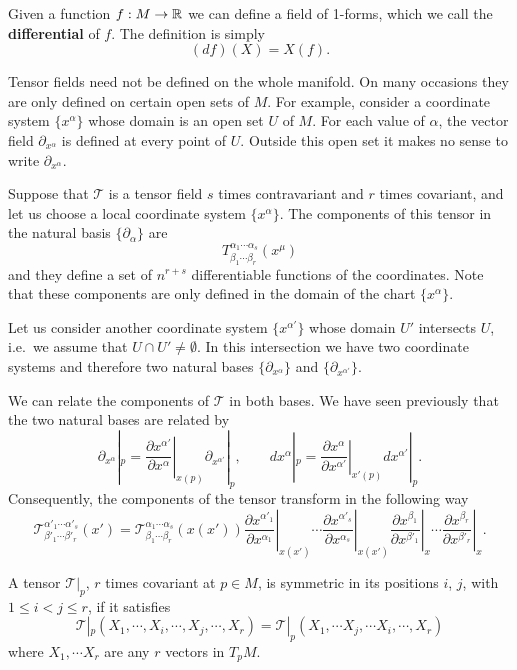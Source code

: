 \begin{points}
\item Given a function $f:M\to\mathbb{R}$ we can define a field of 1-forms, which we call the \textbf{differential} of $f$. The definition is simply
\[
  (df)(X)=X(f).
\]

\item Tensor fields need not be defined on the whole manifold. On many occasions they are only defined on certain open sets of $M$. For example, consider a coordinate system $\{x^\alpha\}$ whose domain is an open set $U$ of $M$. For each value of $\alpha$, the vector field $\partial_{x^\alpha}$ is defined at every point of $U$. Outside this open set it makes no sense to write $\partial_{x^\alpha}$.

\item Suppose that $\mathcal T$ is a tensor field $s$ times contravariant and $r$ times covariant, and let us choose a local coordinate system $\{x^\alpha\}$. The components of this tensor in the natural basis $\{\partial_\alpha\}$ are
\[
  T^{\alpha_1\cdots\alpha_s}_{\beta_1\cdots\beta_r}(x^\mu)
\]
and they define a set of $n^{r+s}$ differentiable functions of the coordinates. Note that these components are only defined in the domain of the chart $\{x^\alpha\}$.

\item Let us consider another coordinate system $\{x^{\alpha'}\}$ whose domain $U'$ intersects $U$, i.e.\ we assume that $U\cap U'\neq\emptyset$. In this intersection we have two coordinate systems and therefore two natural bases $\{\partial_{x^\alpha}\}$ and $\{\partial_{x^{\alpha'}}\}$.

\item We can relate the components of $\mathcal T$ in both bases. We have seen previously that the two natural bases are related by
\[
  \partial_{x^\alpha}|_p=\left.\frac{\partial x^{\alpha'}}{\partial x^\alpha}\right|_{x(p)}\partial_{x^{\alpha'}}|_p,\qquad dx^\alpha|_p=\left.\frac{\partial x^\alpha}{\partial x^{\alpha'}}\right|_{x'(p)}dx^{\alpha'}|_p .
\]
Consequently, the components of the tensor transform in the following way
\[
  \mathcal T^{\alpha'_1\cdots\alpha'_s}_{\beta'_1\cdots\beta'_r}(x')=\mathcal T^{\alpha_1\cdots\alpha_s}_{\beta_1\cdots\beta_r}(x(x'))\left.\frac{\partial x^{\alpha'_1}}{\partial x^{\alpha_1}}\right|_{x(x')}\cdots\left.\frac{\partial x^{\alpha'_s}}{\partial x^{\alpha_s}}\right|_{x(x')}\left.\frac{\partial x^{\beta_1}}{\partial x^{\beta'_1}}\right|_x\cdots\left.\frac{\partial x^{\beta_r}}{\partial x^{\beta'_r}}\right|_x .
\]

\item A tensor $\mathcal T|_p$, $r$ times covariant at $p\in M$, is symmetric in its positions $i$, $j$, with $1\leq i<j\leq r$, if it satisfies
\[
  \mathcal T|_p(X_1,\cdots,X_i,\cdots,X_j,\cdots,X_r)=\mathcal T|_p(X_1,\cdots X_j,\cdots X_i,\cdots,X_r)
\]
where $X_1,\cdots X_r$ are any $r$ vectors in $T_pM$.


\end{points}
